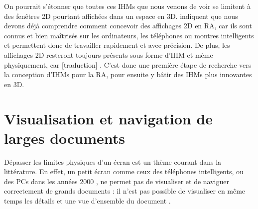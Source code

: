 
On pourrait s'étonner que toutes ces IHMs que nous venons de voir se limitent à des fenêtres 2D pourtant affichées dans un espace en 3D. \cite{Ens2014a} indiquent que nous devons déjà comprendre comment concevoir des affichages 2D en RA, car ils sont connus et bien maîtrisés sur les ordinateurs, les téléphones ou montres intelligents et permettent donc de travailler rapidement et avec précision. De plus, les affichages 2D resteront toujours présents sous forme d'IHM et même physiquement, car [traduction]  \citep[p. 1]{Ens2014a}. C'est donc une première étape de recherche vers la conception d'IHMs pour la RA, pour ensuite y bâtir des IHMs plus innovantes en 3D.


\section{Visualisation et navigation de larges documents}
\label{sec:litterature_large_documents}

Dépasser les limites physiques d'un écran est un thème courant dans la littérature. En effet, un petit écran comme ceux des téléphones intelligents, ou des PCs dans les années 2000 \citep{Baudisch2002}, ne permet pas de visualiser et de naviguer correctement de grands documents : il n'est pas possible de visualiser en même temps les détails et une vue d'ensemble du document .


